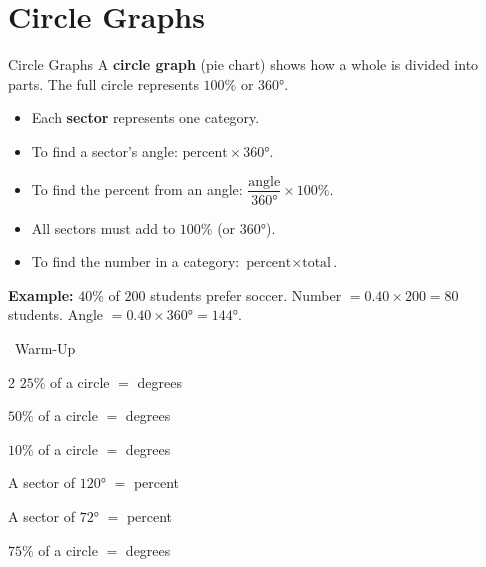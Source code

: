 \section{Circle Graphs}

\begin{quickReview}{Circle Graphs}
A \textbf{circle graph} (pie chart) shows how a whole is divided into parts. The full circle represents $100\%$ or $360°$.

\begin{itemize}[leftmargin=*]
    \item Each \textbf{sector} represents one category.
    \item To find a sector's angle: $\text{percent} \times 360°$.
    \item To find the percent from an angle: $\dfrac{\text{angle}}{360°} \times 100\%$.
    \item All sectors must add to $100\%$ (or $360°$).
    \item To find the number in a category: $\text{percent} \times \text{total}$.
\end{itemize}

\medskip
\textbf{Example:} $40\%$ of $200$ students prefer soccer.
Number $= 0.40 \times 200 = 80$ students. Angle $= 0.40 \times 360° = 144°$.
\end{quickReview}

\begin{practiceBox}[funGreen]{\faSun~Warm-Up}


\begin{multicols}{2}
\prob $25\%$ of a circle $=$ \answerBlank[2cm] degrees

\prob $50\%$ of a circle $=$ \answerBlank[2cm] degrees

\prob $10\%$ of a circle $=$ \answerBlank[2cm] degrees

\prob A sector of $120°$ $=$ \answerBlank[2cm] percent

\prob A sector of $72°$ $=$ \answerBlank[2cm] percent

\prob $75\%$ of a circle $=$ \answerBlank[2cm] degrees
\end{multicols}
\end{practiceBox}

